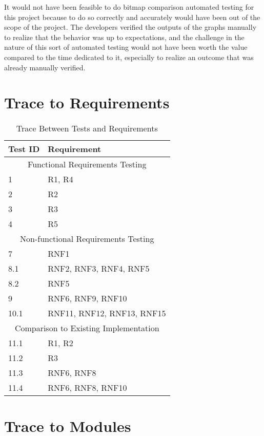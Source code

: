 \documentclass[12pt, titlepage]{article}
\begin{document}
It would not have been feasible to do bitmap comparison automated testing for this project because to do so correctly and accurately would have been out of the scope of the project. The developers verified the outputs of the graphs manually to realize that the behavior was up to expectations, and the challenge in the nature of this sort of automated testing would not have been worth the value compared to the time dedicated to it, especially to realize an outcome that was already manually verified.



\section{Trace to Requirements} %

\begin{table}[h!]
\centering
\begin{tabular}{p{} p{}}
\toprule
\textbf{Test ID} & \textbf{Requirement}\\
\midrule
\multicolumn{2}{c}{Functional Requirements Testing} \\
\midrule
1 & R1, R4 \\
2 & R2 \\
3 & R3 \\
4 & R5 \\

\midrule
\multicolumn{2}{c}{Non-functional Requirements Testing} \\
\midrule

7 & RNF1\\
8.1 & RNF2, RNF3, RNF4, RNF5\\
8.2 & RNF5\\
9 &  RNF6, RNF9, RNF10\\
10.1 & RNF11, RNF12, RNF13, RNF15\\
\midrule
\multicolumn{2}{c}{Comparison to Existing Implementation} \\
\midrule
11.1 & R1, R2\\
11.2 & R3\\
11.3 & RNF6, RNF8\\
11.4 & RNF6, RNF8, RNF10\\
\bottomrule
\end{tabular}
\caption{Trace Between Tests and Requirements}
\end{table}

\pagebreak
		
\section{Trace to Modules} %
\end{document}
